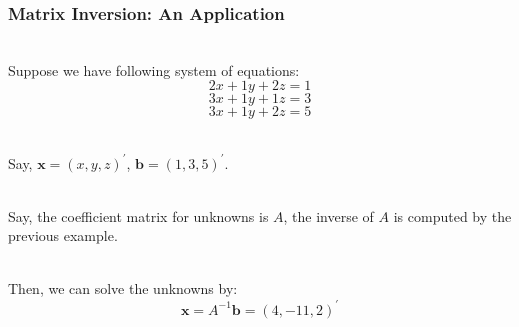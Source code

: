 \documentclass{beamer}
\numberwithin{equation}{section}
\begin{document}
\begin{frame}
\frametitle{Matrix Inversion: An Application}

\ \\Suppose we have following system of equations:
$$2 x + 1 y + 2 z = 1$$
$$3 x + 1 y + 1 z = 3$$
$$3 x + 1 y + 2 z = 5$$

\ \\Say, $\boldsymbol{x} = (x, y, z)^{'}$, $\boldsymbol{b} = (1, 3, 5)^{'}$.

\ \\Say, the coefficient matrix for unknowns is $A$, the inverse of $A$ is computed by the previous example.

\ \\Then, we can solve the unknowns by:
$$\boldsymbol{x} = A^{-1} \boldsymbol{b} = (4, -11, 2)^{'}$$

\end{frame}
\end{document}
